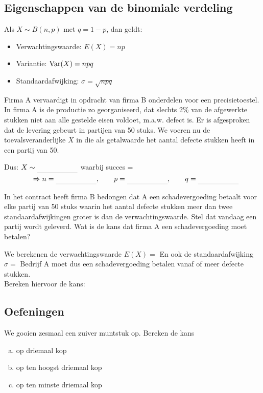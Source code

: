 \documentclass[a4paper,12pt, twoside]{article}
\begin{document}
\needspace{5cm}

\subsection{Eigenschappen van de binomiale verdeling}

\begin{mdframed}
Als $X \sim B(n,p)$ met $q=1-p$, dan geldt:
\begin{itemize}
  \item Verwachtingswaarde: $E(X)=np$
  \item Variantie: $\Var(X)=npq$
  \item Standaardafwijking: $\sigma = \sqrt{npq}$
\end{itemize}
\end{mdframed}

\begin{oefening}
Firma A vervaardigt in opdracht van firma B onderdelen voor een precisietoestel. In firma A is de productie zo georganiseerd, dat slechts 2\% van de afgewerkte stukken niet aan alle gestelde eisen voldoet, m.a.w. defect is.
Er is afgesproken dat de levering gebeurt in partijen van 50 stuks. We voeren nu de toevalsveranderlijke $X$ in die als getalwaarde het aantal defecte stukken heeft in een partij van 50.

Dus: $X\sim\arule{2cm}$ waarbij succes = \arule{3cm}\\
$\qquad\qquad\Rightarrow  n=\arule{2cm}, \qquad p=\arule{2cm}, \qquad q=\arule{2cm}$

In het contract heeft firma B bedongen dat A een schadevergoeding betaalt voor elke partij van 50 stuks waarin het aantal defecte stukken meer dan twee standaardafwijkingen groter is dan de verwachtingswaarde. Stel dat vandaag een partij wordt geleverd. Wat is de kans dat firma A een schadevergoeding moet betalen?

We berekenen de verwachtingswaarde $E(X)=$\arulefill
En ook de standaardafwijking $\sigma=$\arulefill
Bedrijf A moet dus een schadevergoeding betalen vanaf \arule{1cm} of meer defecte stukken.\\
Bereken hiervoor de kans:
\end{oefening}

\pagebreak
\subsection{Oefeningen}

\begin{oefening}
We gooien zesmaal een zuiver muntstuk op. Bereken de kans
\begin{enumerate}[(a)]
  \item op driemaal kop
  \item op ten hoogst driemaal kop
  \item op ten minste driemaal kop
\end{enumerate}
\end{oefening}
\end{document}

